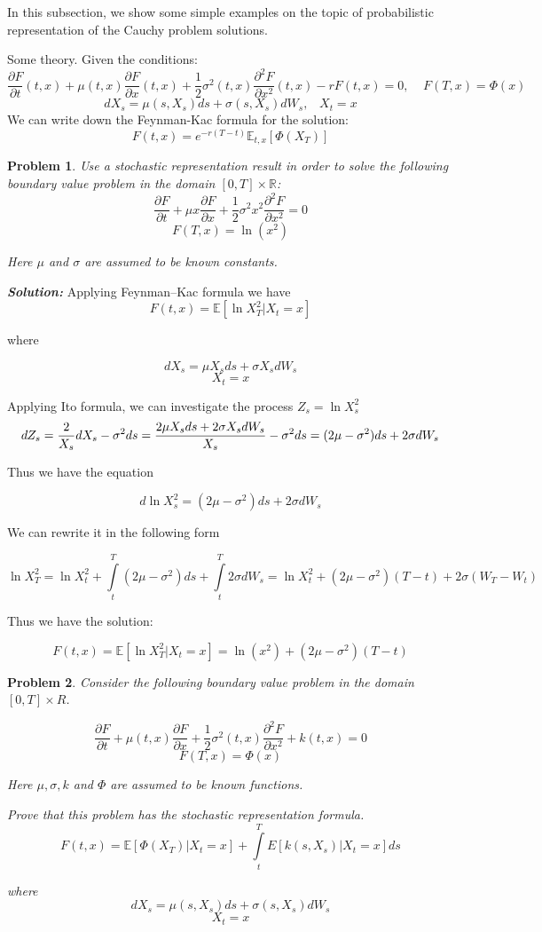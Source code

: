 \documentclass[a4paper, 12pt]{article}
\theoremstyle{problemstyle}
\newtheorem{problem}{Problem}[section]
\newenvironment{solution}
{\textit{\textbf{Solution:}}}
{}
\newcommand{\R}{\mathbb{R}}
\newcommand{\E}{\mathbb{E}}
\begin{document}
\noindent In this subsection, we show some simple examples on the topic of probabilistic representation of the Cauchy problem solutions.

Some theory. Given the conditions:
$$
\frac{\partial F}{\partial t}(t, x)  + \mu(t, x) \frac{\partial F}{\partial x}(t, x)  + \frac{1}{2} \sigma^2(t, x) \frac{\partial^2 F}{\partial x^2 }(t, x)
-rF(t, x)  = 0,
\;\;\;\; F(T, x) = \Phi(x)
$$
$$
dX_s = \mu(s, X_s) ds + \sigma(s, X_s)dW_s, \;\;\;  X_t = x
$$
We can write down the Feynman-Kac formula for the solution:
$$
F(t, x) = e^{-r(T-t)}\E_{t, x}[\Phi(X_T)]
$$
\begin{problem}
Use a stochastic representation result in order to solve the following boundary value problem in the domain  $[0, T] \times \R$:
$$
\frac{\partial F}{\partial t} + \mu x \frac{\partial F}{\partial x} + \frac{1}{2} \sigma^2 x^2 \frac{\partial^2 F}{\partial x^2 } = 0
$$    
$$
F(T,x) = \ln(x^2) 
$$

Here $\mu$ and $\sigma$ are assumed to be known constants.

\end{problem}

\begin{solution}
    Applying Feynman–Kac formula we have
$$
F(t,x) = \E[\ln X_T^2| X_t = x]
$$

where

$$
dX_s = \mu X_s ds + \sigma X_s dW_s
$$
$$
X_t = x
$$

Applying Ito formula, we can investigate the process $Z_s = \ln X_s^2$
$$
d Z_s = \frac{2}{X_s}dX_s - \sigma^2 ds = \frac{2\mu X_s ds + 2 \sigma X_s dW_s}{X_s} - \sigma^2 ds = (2\mu - \sigma^2)ds + 2\sigma dW_s\\
$$

Thus we have the equation

$$
d \ln X^2_s = (2\mu - \sigma^2)ds + 2\sigma dW_s
$$

We can rewrite it in the following form

$$
\ln X_T^2= \ln X_t^2 + \int\limits_t^T (2\mu - \sigma^2) ds + \int\limits_{t}^{T}2\sigma dW_s = \ln X_t^2 + (2\mu - \sigma^2) (T-t) + 2\sigma (W_T - W_t)
$$

Thus we have the solution:

$$
F(t,x) = \E[\ln X_T^2| X_t = x] = \ln(x^2) + (2\mu - \sigma^2) (T-t)
$$
\end{solution}

\begin{problem}
Consider the following boundary value problem in the domain
$[0,T] \times R$.

$$ 
\frac{\partial F}{\partial t} + \mu(t,x) \frac{\partial F}{\partial x} + \frac{1}{2}\sigma^2(t,x) \frac{\partial^2 F}{\partial x^2} + k(t,x) = 0
$$
$$
F(T,x) = \Phi(x)
$$

Here $\mu, \sigma, k$ and $\Phi$ are assumed to be known functions.

Prove that this problem has the stochastic representation formula.
$$
F(t, x) = \E[\Phi(X_T)| X_t = x] + \int\limits_t^T E[k(s, X_s)|X_t = x]ds
$$

where 
$$
dX_s = \mu(s, X_s) ds + \sigma(s, X_s) dW_s
$$
$$
X_t = x
$$
\end{problem}
\end{document}
